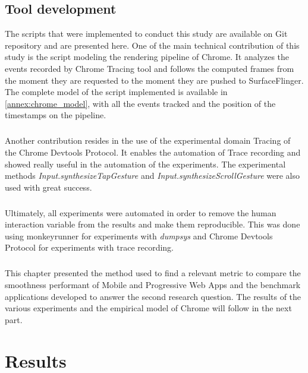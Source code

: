 \documentclass{kththesis}
\begin{document}
\section{Tool development}

The scripts that were implemented to conduct this study are available on Git repository and are presented here. One of the main technical contribution of this study is the script modeling the rendering pipeline of Chrome. It analyzes the events recorded by Chrome Tracing tool and follows the computed frames from the moment they are requested to the moment they are pushed to SurfaceFlinger. The complete model of the script implemented is available in \autoref{annex:chrome_model}, with all the events tracked and the position of the timestamps on the pipeline.
\paragraph{}
Another contribution resides in the use of the experimental domain Tracing of the Chrome Devtools Protocol. It enables the automation of Trace recording and showed really useful in the automation of the experiments. The experimental methods \textit{Input.synthesizeTapGesture} and \textit{Input.synthesizeScrollGesture} were also used with great success.
\paragraph{}
Ultimately, all experiments were automated in order to remove the human interaction variable from the results and make them reproducible. This was done using monkeyrunner for experiments with \textit{dumpsys} and Chrome Devtools Protocol for experiments with trace recording.

\paragraph{}
This chapter presented the method used to find a relevant metric to compare the smoothness performant of Mobile and Progressive Web Apps and the benchmark applications developed to answer the second research question. The results of the various experiments and the empirical model of Chrome will follow in the next part.

\chapter{Results}

\end{document}
